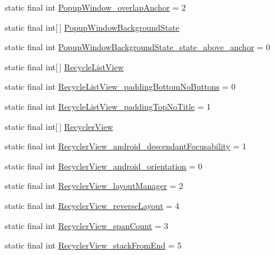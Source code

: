 \begin{CompactItemize}
\item 
static final int \hyperlink{classandroid_1_1support_1_1v4_1_1_r_1_1styleable_5bdcff06e514b36248013954ab1337cb}{PopupWindow\_\-overlapAnchor} = 2
\item 
static final int\mbox{[}$\,$\mbox{]} \hyperlink{classandroid_1_1support_1_1v4_1_1_r_1_1styleable_56d74cecf54da79f987d78d92156efde}{PopupWindowBackgroundState}
\item 
static final int \hyperlink{classandroid_1_1support_1_1v4_1_1_r_1_1styleable_79a9881bda014af06ecb1d745e81265d}{PopupWindowBackgroundState\_\-state\_\-above\_\-anchor} = 0
\item 
static final int\mbox{[}$\,$\mbox{]} \hyperlink{classandroid_1_1support_1_1v4_1_1_r_1_1styleable_01daac6761518f23e42dc126a1955191}{RecycleListView}
\item 
static final int \hyperlink{classandroid_1_1support_1_1v4_1_1_r_1_1styleable_c989ee173d297d6b648e6a7c3570d103}{RecycleListView\_\-paddingBottomNoButtons} = 0
\item 
static final int \hyperlink{classandroid_1_1support_1_1v4_1_1_r_1_1styleable_f5dc6d14ce6c3162b12e614839fced9b}{RecycleListView\_\-paddingTopNoTitle} = 1
\item 
static final int\mbox{[}$\,$\mbox{]} \hyperlink{classandroid_1_1support_1_1v4_1_1_r_1_1styleable_2cdeae02a2aae8e03f8765ed3a43caf5}{RecyclerView}
\item 
static final int \hyperlink{classandroid_1_1support_1_1v4_1_1_r_1_1styleable_08c04653d12c32cd2312f55a2e1e68a9}{RecyclerView\_\-android\_\-descendantFocusability} = 1
\item 
static final int \hyperlink{classandroid_1_1support_1_1v4_1_1_r_1_1styleable_e008924d6df8616aad567584258f56bf}{RecyclerView\_\-android\_\-orientation} = 0
\item 
static final int \hyperlink{classandroid_1_1support_1_1v4_1_1_r_1_1styleable_fb053f97984703efea988f5a33cc13a8}{RecyclerView\_\-layoutManager} = 2
\item 
static final int \hyperlink{classandroid_1_1support_1_1v4_1_1_r_1_1styleable_1e1cc171f4107ce021536bcce00230c6}{RecyclerView\_\-reverseLayout} = 4
\item 
static final int \hyperlink{classandroid_1_1support_1_1v4_1_1_r_1_1styleable_5a5fe0e2fd166ebd52eb768888d065db}{RecyclerView\_\-spanCount} = 3
\item 
static final int \hyperlink{classandroid_1_1support_1_1v4_1_1_r_1_1styleable_41dd2629b266247a80ee2bacd4525923}{RecyclerView\_\-stackFromEnd} = 5
\item 

\end{CompactItemize}
